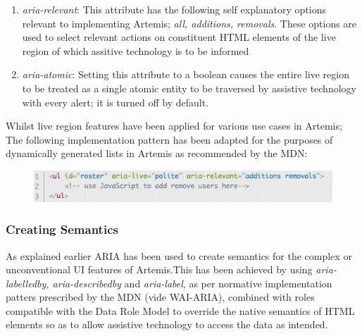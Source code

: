 \begin{enumerate}
\begin{enumerate}
\begin{enumerate}
    \item \textit{aria-relevant}: This attribute has the following self explanatory options relevant to implementing Artemis; \textit{all, additions, removals}. These options are used to select relevant actions on constituent HTML elements of the live region of which assitive technology is to be informed 
    
    \item \textit{aria-atomic}: Setting this attribute to  a boolean  causes the entire live region to be treated as a single atomic entity to be traversed by assistive technology with every alert; it is turned off by default.
    
    \end{enumerate}

    Whilst live region features have been applied for various use cases in Artemis; The following implementation pattern has been adapted for the purposes of dynamically generated  lists in Artemis  as recommended by the MDN:
    
    \begin{figure}[h]
    	\includegraphics[scale=0.55,right]{chapters/appendices/figures/patternLive.png}
    	\label{ariaHidden}
    \end{figure}
    
    
    
\end{enumerate}
\end{enumerate}




\subsubsection{Creating Semantics}

As explained earlier ARIA has been used to create semantics for the complex or unconventional UI features of Artemis.This has been achieved by  using \textit{aria-labelledby, aria-describedby} and \textit{aria-label}, as per normative implementation patters prescribed by the MDN (vide WAI-ARIA), combined with roles compatible with the Data Role Model to override the native semantics of HTML elements so as to allow assistive technology to access the data as intended.

